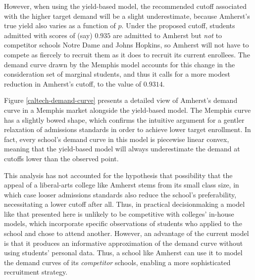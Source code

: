 \documentclass[12pt]{article}
\numberwithin{equation}{subsection}
\theoremstyle{definition}
\begin{document}
However, when using the yield-based model, the recommended cutoff associated with the higher target demand will be a slight underestimate, because Amherst's true yield also varies as a function of $p$. Under the proposed cutoff, students admitted with scores of (say) $0.935$ are admitted to Amherst but \emph{not} to competitor schools Notre Dame and Johns Hopkins, so Amherst will not have to compete as fiercely to recruit them as it does to recruit its current enrollees. The demand curve drawn by the Memphis model accounts for this change in the consideration set of marginal students, and thus it calls for a more modest reduction in Amherst's cutoff, to the value of $0.9314$.

Figure \ref{caltech-demand-curve} presents a detailed view of Amherst's demand curve in a Memphis market alongside the yield-based model. The Memphis curve has a slightly bowed shape, which confirms the intuitive argument for a gentler relaxation of admissions standards in order to achieve lower target enrollment. In fact, every school’s demand curve in this model is piecewise linear convex, meaning that the yield-based model will always underestimate the demand at cutoffs lower than the observed point.

This analysis has not accounted for the hypothesis that possibility that the appeal of a liberal-arts college like Amherst stems from its small class size, in which case looser admissions standards also reduce the school's preferability, necessitating a lower cutoff after all. Thus, in practical decisionmaking a model like that presented here is unlikely to be competitive with colleges' in-house models, which incorporate specific observations of students who applied to the school and chose to attend another. However, an advantage of the current model is that it produces an informative approximation of the demand curve without using students' personal data. Thus, a school like Amherst can use it to model the demand curves of its \emph{competitor} schools, enabling a more sophisticated recruitment strategy. 




\end{document}
